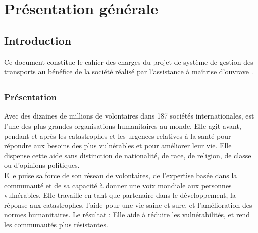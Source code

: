 
%	

\chapter{Présentation générale}

\section{Introduction}
Ce document constitue le cahier des charges du projet de système de gestion des transports au bénéfice de la société \mo réalisé par l'assistance à maîtrise d'ouvrave \amo.

\section{\mo}
\subsection{Présentation}
Avec des dizaines de millions de volontaires dans 187 sociétés internationales, \mo est l'une des plus grandes organisations humanitaires au monde. Elle agit avant, pendant et après les catastrophes et les urgences relatives à la santé pour répondre aux besoins des plus vulnérables et pour améliorer leur vie. Elle dispense cette aide sans distinction de nationalité, de race, de religion, de classe ou d'opinions politiques.
\\
Elle puise sa force de son réseau de volontaires, de l'expertise basée dans la communauté et de sa capacité à donner une voix mondiale aux personnes vulnérables. Elle travaille en tant que partenaire dans le développement, la réponse aux catastrophes, l'aide pour une vie saine et sure, et l'amélioration des normes humanitaires. Le résultat : Elle aide à réduire les vulnérabilités, et rend les communautés plus résistantes.

